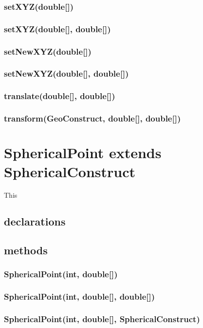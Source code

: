 \documentclass[a4paper,10pt]{report}
\begin{document}
\subsubsection{setXYZ(double[])}
\subsubsection{setXYZ(double[], double[])}
\subsubsection{setNewXYZ(double[])}
\subsubsection{setNewXYZ(double[], double[])}
\subsubsection{translate(double[], double[])}
\subsubsection{transform(GeoConstruct, double[], double[])}
\section{SphericalPoint extends SphericalConstruct} This
\subsection{declarations}
\subsubsection{}
\subsection{methods}
\subsubsection{SphericalPoint(int, double[])}
\subsubsection{SphericalPoint(int, double[], double[])}
\subsubsection{SphericalPoint(int, double[], SphericalConstruct)}
\end{document}
